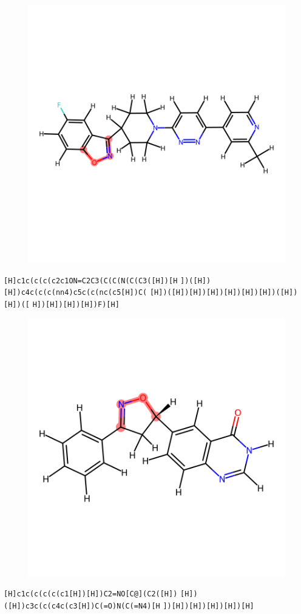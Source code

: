 \documentclass{article}
\begin{document}
\begin{figure}[ht]
\centering
    \includegraphics{mol198.png}
\end{figure}
\verb|[H]c1c(c(c(c2c1ON=C2C3(C(C(N(C(C3([H])[H| \verb|])([H])[H])c4c(c(c(nn4)c5c(c(nc(c5[H])C(| \verb|[H])([H])[H])[H])[H])[H])[H])([H])[H])([| \verb|H])[H])[H])[H])F)[H]|

\begin{figure}[ht]
\centering
    \includegraphics{mol199.png}
\end{figure}
\verb|[H]c1c(c(c(c(c1[H])[H])C2=NO[C@](C2([H])| \verb|[H])([H])c3c(c(c4c(c3[H])C(=O)N(C(=N4)[H| \verb|])[H])[H])[H])[H])[H]|
\end{document}
